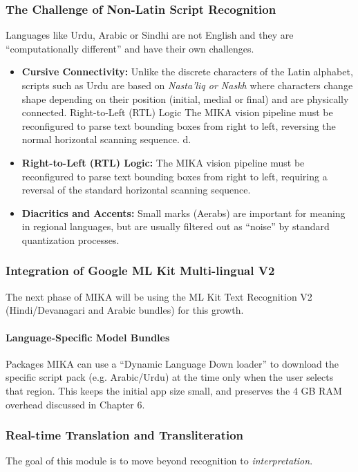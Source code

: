 \documentclass[12pt,a4paper]{report}
\begin{document}
\subsubsection{The Challenge of Non-Latin Script Recognition}
Languages like Urdu, Arabic or Sindhi are not English and they are “computationally different” and have their own challenges. 
\begin{itemize}
    \item \textbf{Cursive Connectivity:} Unlike the discrete characters of the Latin alphabet, scripts such as Urdu are based on \textit{Nasta'liq or Naskh} where characters change shape depending on their position (initial, medial or final) and are physically connected. Right-to-Left (RTL) Logic The MIKA vision pipeline must be reconfigured to parse text bounding boxes from right to left, reversing the normal horizontal scanning sequence. d.
    \item \textbf{Right-to-Left (RTL) Logic:} The MIKA vision pipeline must be reconfigured to parse text bounding boxes from right to left, requiring a reversal of the standard horizontal scanning sequence.
    \item \textbf{Diacritics and Accents:}  Small marks (Aerabs) are important for meaning in regional languages, but are usually filtered out as “noise” by standard quantization processes.
\end{itemize}
 
\subsubsection{Integration of Google ML Kit Multi-lingual V2}
The next phase of MIKA will be using the ML Kit Text Recognition V2 (Hindi/Devanagari and Arabic bundles) for this growth.
\paragraph{Language-Specific Model Bundles} Packages MIKA can use a “Dynamic Language Down loader” to download the specific script pack (e.g. Arabic/Urdu) at the time only when the user selects that region. This keeps the initial app size small, and preserves the 4 GB RAM overhead discussed in Chapter 6.
 
\subsubsection{Real-time Translation and Transliteration}
The goal of this module is to move beyond recognition to \textit{interpretation}.
\end{document}
